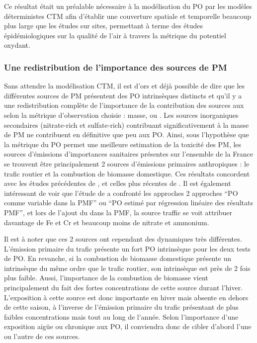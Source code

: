 Ce résultat était un préalable nécessaire à la modélisation du PO par les modèles
déterministes CTM afin d'établir une couverture spatiale et temporelle beaucoup plus
large que les études sur sites, permettant à terme des études épidémiologiques sur la
qualité de l'air à travers la métrique du potentiel oxydant.

\subsubsection{Une redistribution de l'importance des sources de PM}%
\label{ssub:une_redistribution_de_l_importance_des_sources_de_pm}

Sans attendre la modélisation CTM, il est d'ors et déjà possible de dire que les
différentes sources de PM présentent des PO intrinsèques distincts et qu'il y a une
redistribution complète de l'importance de la contribution des sources aux \PMdix{} selon
la métrique d'observation choisie : masse, \POAAv{} ou \PODTTv. Les sources inorganiques
secondaires (nitrate-rich et sulfate-rich) contribuant significativement à la masse de PM
ne contribuent en définitive que peu aux PO. Ainsi, sous l'hypothèse que la métrique du PO
permet une meilleure estimation de la toxicité des PM, les sources d'émissions
d'importances sanitaires présentes sur l'ensemble de la France se trouvent être
principalement 2 sources d'émissions primaires anthropiques : le trafic routier et la
combustion de biomasse domestique. Ces résultats concordent avec les études précédentes de
\cite{batesReactive2015,fangOxidative2016}, et celles plus récentes de
\cite{paraskevopoulouYearlong2019,cesariSource2019}. Il est également intéressant de voir
que l'étude de \cite{cesariSource2019} a confronté les approches 2 approches ``PO comme
variable dans la PMF'' ou ``PO estimé par régression linéaire des résultats PMF'', et lors
de l'ajout du \PODTTv{} dans la PMF, la source traffic se voit attribuer davantage de Fe
et Cr et beaucoup moins de nitrate et ammonium.

Il est à noter que ces 2 sources ont cependant des dynamiques très différentes. L'émission
primaire du trafic présente un fort PO intrinsèque pour les deux tests de PO.
En revanche, si la combustion de biomasse domestique présente un \POAA{} intrinsèque du
même ordre que le trafic routier, son \PODTT{} intrinsèque est près de 2 fois plus
faible. Aussi, l'importance de la combustion de biomasse vient principalement du fait des
fortes concentrations de cette source durant l'hiver. L'exposition à cette source est donc
importante en hiver mais absente en dehors de cette saison, à l'inverse de l'émission
primaire du trafic présentant de plus faibles concentrations mais tout au long de l'année.
Selon l'importance d'une exposition aigüe ou chronique aux PO, il conviendra donc de
cibler d'abord l'une ou l'autre de ces sources.

